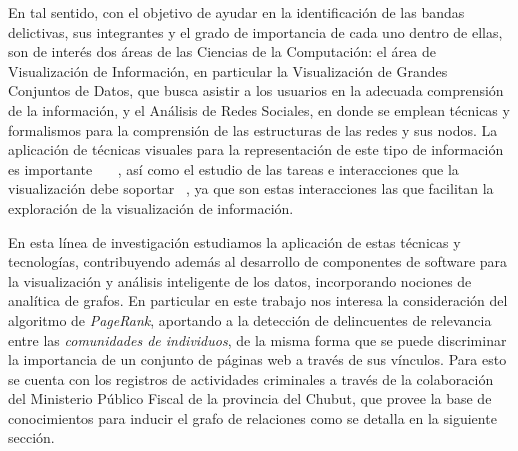 En tal sentido, con el objetivo de ayudar en la identificación de las bandas delictivas, sus integrantes y el grado de importancia de cada uno dentro de ellas, son de interés dos áreas de las Ciencias de la Computación: el área de Visualización de Información, en particular la Visualización de Grandes Conjuntos de Datos, que busca asistir a los usuarios en la adecuada comprensión de la información, y el Análisis de Redes Sociales, en donde se emplean técnicas y formalismos para la comprensión de las estructuras de las redes y sus nodos. 
La aplicación de técnicas visuales para la representación de este tipo de información es importante ~\cite{xu2005criminal}~\cite{feng2019big}~\cite{mathew2021criminal}, así como el estudio de las tareas e interacciones que la visualización debe soportar ~\cite{chen2005visualization}, ya que son estas interacciones las que facilitan la exploración de la visualización de información.

En esta línea de investigación estudiamos la aplicación de estas técnicas y tecnologías, contribuyendo además al desarrollo de componentes de software para la visualización y análisis inteligente de los datos, incorporando nociones de analítica de grafos. 
En particular en este trabajo nos interesa la consideración del algoritmo de \textit{PageRank}, aportando a la detección de delincuentes de relevancia entre las \textit{comunidades de individuos}, de la misma forma que se puede discriminar la importancia de un conjunto de páginas web a través de sus vínculos. 
Para esto se cuenta con los registros de actividades criminales a través de la colaboración del Ministerio Público Fiscal de la provincia del Chubut, que provee la base de conocimientos para inducir el grafo de relaciones como se detalla en la siguiente sección.